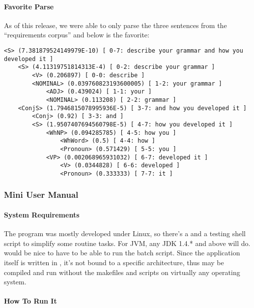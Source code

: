 \scriptsize

\normalsize


\paragraph{Favorite Parse}

As of this release, we were able to only parse the three sentences
from the ``requirements corpus'' and below is the favorite:

\begin{verbatim}
<S> (7.381879524149979E-10) [ 0-7: describe your grammar and how you developed it ]
    <S> (4.11319751814313E-4) [ 0-2: describe your grammar ]
        <V> (0.206897) [ 0-0: describe ]
        <NOMINAL> (0.039760823193600005) [ 1-2: your grammar ]
            <ADJ> (0.439024) [ 1-1: your ]
            <NOMINAL> (0.113208) [ 2-2: grammar ]
    <ConjS> (1.7946815078995936E-5) [ 3-7: and how you developed it ]
        <Conj> (0.92) [ 3-3: and ]
        <S> (1.9507407694560798E-5) [ 4-7: how you developed it ]
            <WhNP> (0.094285785) [ 4-5: how you ]
                <WhWord> (0.5) [ 4-4: how ]
                <Pronoun> (0.571429) [ 5-5: you ]
            <VP> (0.002068965931032) [ 6-7: developed it ]
                <V> (0.0344828) [ 6-6: developed ]
                <Pronoun> (0.333333) [ 7-7: it ]
\end{verbatim}


\subsubsection{Mini User Manual}
\label{sect:prob-manual}

\paragraph{System Requirements}

The program was mostly developed under Linux, so there's
a  and a testing shell script to simplify some routine tasks.
For JVM, any JDK 1.4.* and above will do.  would be nice
to have to be able to run the batch script. Since the application
itself is written in {\java}, it's not bound to a specific architecture,
thus may be compiled and run without the makefiles and scripts
on virtually any operating system.

\paragraph{How To Run It}

